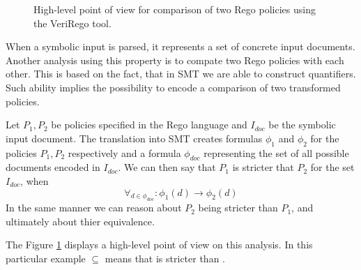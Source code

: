 \begin{figure}
    \label{fig:verirego-analysis-comparison}
    \centering
    
    \caption{High-level point of view for comparison of two Rego policies using the VeriRego tool.}
\end{figure}

When a symbolic input is parsed, it represents a set of concrete input documents.
Another analysis using this property is to compate two Rego policies with each other.
This is based on the fact, that in SMT we are able to construct quantifiers.
Such ability implies the possibility to encode a comparison of two transformed policies.

Let $P_1,P_2$ be policies specified in the Rego language and $I_{doc}$ be the symbolic input document.
The translation into SMT creates formulas $\phi_1$ and $\phi_2$ for the policies $P_1,P_2$ respectively and a formula $\phi_{doc}$ representing the set of all possible documents encoded in $I_{doc}$.
We can then say that $P_1$ is stricter that $P_2$ for the set $I_{doc}$, when
$$ \forall_{d \in \phi_{doc}}: \phi_1(d) \rightarrow \phi_2(d) $$
In the same manner we can reason about $P_2$ being stricter than $P_1$, and ultimately about thier equivalence.

The Figure \ref{fig:verirego-analysis-comparison} displays a high-level point of view on this analysis.
In this particular example  $\subseteq$  means that  is stricter than .
